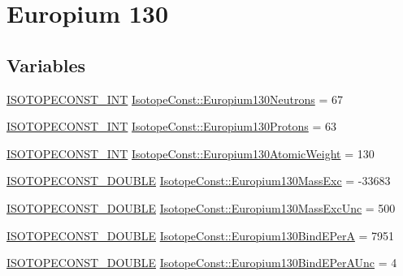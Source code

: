 \hypertarget{group___isotope_const-_europium-_eu130}{}\section{Europium 130}
\label{group___isotope_const-_europium-_eu130}
\subsection*{Variables}
\begin{DoxyCompactItemize}
\item 
\mbox{\hyperlink{group___isotope_const-_macros_ga5f18360b3e99483a35c32d789e62621c}{I\+S\+O\+T\+O\+P\+E\+C\+O\+N\+S\+T\+\_\+\+I\+NT}} \mbox{\hyperlink{group___isotope_const-_europium-_eu130_gadeae5c6f304b67df3522d88737422536}{Isotope\+Const\+::\+Europium130\+Neutrons}} = 67
\item 
\mbox{\hyperlink{group___isotope_const-_macros_ga5f18360b3e99483a35c32d789e62621c}{I\+S\+O\+T\+O\+P\+E\+C\+O\+N\+S\+T\+\_\+\+I\+NT}} \mbox{\hyperlink{group___isotope_const-_europium-_eu130_gab05330ec1972e5738b3924473ac970cc}{Isotope\+Const\+::\+Europium130\+Protons}} = 63
\item 
\mbox{\hyperlink{group___isotope_const-_macros_ga5f18360b3e99483a35c32d789e62621c}{I\+S\+O\+T\+O\+P\+E\+C\+O\+N\+S\+T\+\_\+\+I\+NT}} \mbox{\hyperlink{group___isotope_const-_europium-_eu130_ga81d646289ac377dd0cbe37bf31127a96}{Isotope\+Const\+::\+Europium130\+Atomic\+Weight}} = 130
\item 
\mbox{\hyperlink{group___isotope_const-_macros_ga8f45a7272ce02c0b4c65c44636ed719a}{I\+S\+O\+T\+O\+P\+E\+C\+O\+N\+S\+T\+\_\+\+D\+O\+U\+B\+LE}} \mbox{\hyperlink{group___isotope_const-_europium-_eu130_ga163bcbb66126ef95ad07dfdd209c5cc0}{Isotope\+Const\+::\+Europium130\+Mass\+Exc}} = -\/33683
\item 
\mbox{\hyperlink{group___isotope_const-_macros_ga8f45a7272ce02c0b4c65c44636ed719a}{I\+S\+O\+T\+O\+P\+E\+C\+O\+N\+S\+T\+\_\+\+D\+O\+U\+B\+LE}} \mbox{\hyperlink{group___isotope_const-_europium-_eu130_ga117c0c39ed7630da434ff3f3f8d9a831}{Isotope\+Const\+::\+Europium130\+Mass\+Exc\+Unc}} = 500
\item 
\mbox{\hyperlink{group___isotope_const-_macros_ga8f45a7272ce02c0b4c65c44636ed719a}{I\+S\+O\+T\+O\+P\+E\+C\+O\+N\+S\+T\+\_\+\+D\+O\+U\+B\+LE}} \mbox{\hyperlink{group___isotope_const-_europium-_eu130_gaea002fb2baef6bb011e067c105bfe423}{Isotope\+Const\+::\+Europium130\+Bind\+E\+PerA}} = 7951
\item 
\mbox{\hyperlink{group___isotope_const-_macros_ga8f45a7272ce02c0b4c65c44636ed719a}{I\+S\+O\+T\+O\+P\+E\+C\+O\+N\+S\+T\+\_\+\+D\+O\+U\+B\+LE}} \mbox{\hyperlink{group___isotope_const-_europium-_eu130_ga0e324118394c2ca333b2b178da932fa3}{Isotope\+Const\+::\+Europium130\+Bind\+E\+Per\+A\+Unc}} = 4

\end{DoxyCompactItemize}
